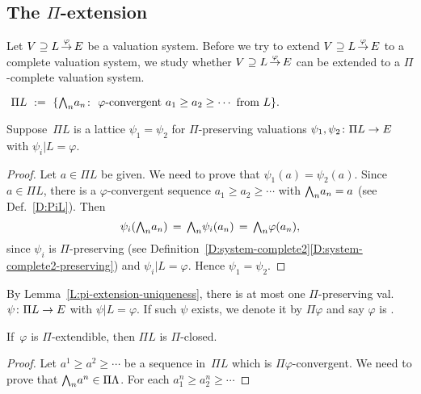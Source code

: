 \documentclass[main.tex]{subfiles}
\begin{document}
\subsection{The $\Pi$-extension}
Let $V \supseteq L\,\smash{\stackrel{\varphi}{\rightarrow}}\,E$ be a valuation system.
Before we try to extend $V \supseteq L\,\smash{\stackrel{\varphi}{\rightarrow}}\,E$ to a complete
valuation system, 
we study whether $V \supseteq L\,\smash{\stackrel{\varphi}{\rightarrow}}\,E$
can be extended to a $\Pi$-complete valuation system.

\begin{dfn}
\label{D:PiL}
$\ \Pi L \ \eqdf \ \{ 
\bw_n a_n \colon \ \text{$\varphi$-convergent }
 a_1\geq a_2 \geq\dotsb \text{ from $L$} \}.$
\end{dfn}

\begin{lem}
\label{L:pi-extension-uniqueness}
Suppose~$\Pi L$ is a lattice
$\psi_1 = \psi_2$
for $\Pi$-preserving valuations $\psi_1,\psi_2\colon \Pi L\rightarrow E$
with $\psi_i | L = \varphi$.
\end{lem}
\begin{proof}
Let $a\in\Pi L$ be given.
We need to prove that $\psi_1 (a) = \psi_2(a)$.
Since~$a\in \Pi L$,
there is a  $\varphi$-convergent sequence
$a_1 \geq a_2 \geq \dotsb$ with $\textstyle{\bigwedge}_n a_n = a$
(see Def.~\ref{D:PiL}).
Then
\begin{equation*}
\psi_i ( \textstyle{\bigwedge}_n a_n ) \,=\, \textstyle{\bigwedge}_n \psi_i (a_n) \,=\, \textstyle{\bigwedge}_n \varphi(a_n),
\end{equation*}
since $\psi_i$ is $\Pi$-preserving 
(see Definition~\ref{D:system-complete2}\ref{D:system-complete2-preserving})
 and $\psi_i | L = \varphi$.
Hence $\psi_1 = \psi_2$.
\end{proof}

\begin{dfn}
\label{D:pi-extendible}
By Lemma~\ref{L:pi-extension-uniqueness},
there is at most one
 $\Pi$-preserving val.~$\psi\colon \Pi L\rightarrow E$
with $\psi | L = \varphi$.
If such $\psi$ exists,
we denote it by $\Pi\varphi$
and say $\varphi$ is .
\end{dfn}

\begin{lem}
If~$\varphi$ is $\Pi$-extendible,
then $\Pi L$ is $\Pi$-closed.
\end{lem}
\begin{proof}
Let $a^1\geq a^2 \geq \dotsb$ be a sequence in~$\Pi L$
which is $\Pi\varphi$-convergent.
We need to prove that $\textstyle{\bigwedge}_n a^n \in \Pi \Lambda$.
For each $a^n_1 \geq a^n_2 \geq \dotsb$

\end{proof}
\end{document}
